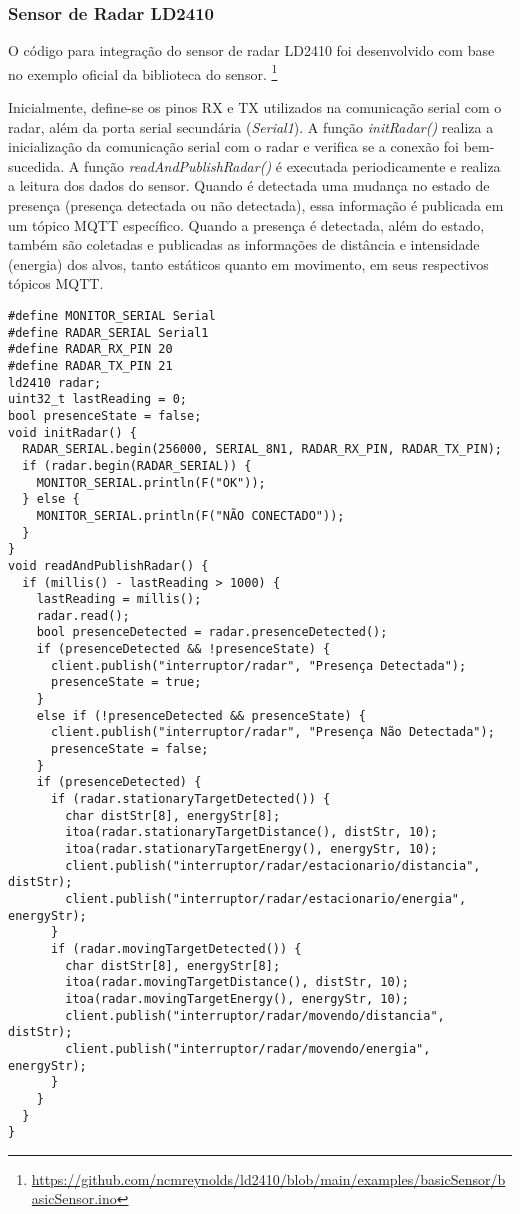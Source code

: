 \documentclass[]{abntex2}
\begin{document}
\subsubsection{Sensor de Radar LD2410}

O código para integração do sensor de radar LD2410 foi desenvolvido com base no
exemplo oficial da biblioteca do sensor.
\footnote{\url{https://github.com/ncmreynolds/ld2410/blob/main/examples/basicSensor/basicSensor.ino}}

Inicialmente, define-se os pinos RX e TX utilizados na comunicação serial com o
radar, além da porta serial secundária (\textit{Serial1}). A função
\textit{initRadar()} realiza a inicialização da comunicação serial com o radar e
verifica se a conexão foi bem-sucedida. A função \textit{readAndPublishRadar()}
é executada periodicamente e realiza a leitura dos dados do sensor. Quando é
detectada uma mudança no estado de presença (presença detectada ou não
detectada), essa informação é publicada em um tópico MQTT específico. Quando a
presença é detectada, além do estado, também são coletadas e publicadas as
informações de distância e intensidade (energia) dos alvos, tanto estáticos
quanto em movimento, em seus respectivos tópicos MQTT.
\clearpage
\begin{verbatim}
#define MONITOR_SERIAL Serial
#define RADAR_SERIAL Serial1
#define RADAR_RX_PIN 20
#define RADAR_TX_PIN 21
ld2410 radar;
uint32_t lastReading = 0;
bool presenceState = false;
void initRadar() {
  RADAR_SERIAL.begin(256000, SERIAL_8N1, RADAR_RX_PIN, RADAR_TX_PIN);
  if (radar.begin(RADAR_SERIAL)) {
    MONITOR_SERIAL.println(F("OK"));
  } else {
    MONITOR_SERIAL.println(F("NÃO CONECTADO"));
  }
}
void readAndPublishRadar() {
  if (millis() - lastReading > 1000) {
    lastReading = millis();
    radar.read();
    bool presenceDetected = radar.presenceDetected();
    if (presenceDetected && !presenceState) {
      client.publish("interruptor/radar", "Presença Detectada");
      presenceState = true;
    }
    else if (!presenceDetected && presenceState) {
      client.publish("interruptor/radar", "Presença Não Detectada");
      presenceState = false;
    }
    if (presenceDetected) {
      if (radar.stationaryTargetDetected()) {
        char distStr[8], energyStr[8];
        itoa(radar.stationaryTargetDistance(), distStr, 10);
        itoa(radar.stationaryTargetEnergy(), energyStr, 10);
        client.publish("interruptor/radar/estacionario/distancia", distStr);
        client.publish("interruptor/radar/estacionario/energia", energyStr);
      }
      if (radar.movingTargetDetected()) {
        char distStr[8], energyStr[8];
        itoa(radar.movingTargetDistance(), distStr, 10);
        itoa(radar.movingTargetEnergy(), energyStr, 10);
        client.publish("interruptor/radar/movendo/distancia", distStr);
        client.publish("interruptor/radar/movendo/energia", energyStr);
      }
    }
  }
}
\end{verbatim}
\end{document}
